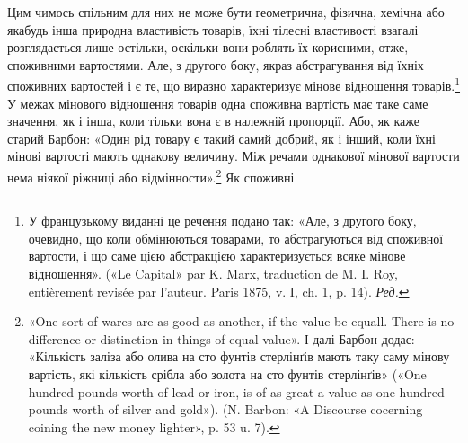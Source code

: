 Цим чимось спільним для них не може бути геометрична, фізична,
хемічна або якабудь інша природна властивість товарів,
їхні тілесні властивості взагалі розглядається лише остільки,
оскільки вони роблять їх корисними, отже, споживними вартостями.
Але, з другого боку, якраз абстрагування від їхніх споживних
вартостей і є те, що виразно характеризує мінове відношення
товарів.\footnote*{
У французькому виданні це речення подано так: «Але, з другого
боку, очевидно, що коли обмінюються товарами, то абстрагуються від
споживної вартости, і що саме цією абстракцією характеризується всяке
мінове відношення». («Le Capital» par K. Marx, traduction de M. I. Roy,
entièrement revisée par l’auteur. Paris 1875, v. I, ch. 1, p. 14). \emph{Ред.}
} У межах мінового відношення товарів одна споживна
вартість має таке саме значення, як і інша, коли тільки
вона є в належній пропорції. Або, як каже старий Барбон: «Один
рід товару є такий самий добрий, як і інший, коли їхні мінові
вартості мають однакову величину. Між речами однакової мінової
вартости нема ніякої ріжниці або відмінности».\footnote{
«One sort of wares are as good as another, if the value be equall.
There is no difference or distinction in things of equal value». І далі Барбон
додає: «Кількість заліза або олива на сто фунтів стерлінґів мають таку
саму мінову вартість, які кількість срібла або золота на сто фунтів стерлінґів»
(«One hundred pounds worth of lead or iron, is of as great a value
as one hundred pounds worth of silver and gold»). (N. Barbon: «A Discourse
cocerning coining the new money lighter», p. 53 u. 7).
} Як споживні
\parbreak{}  %
